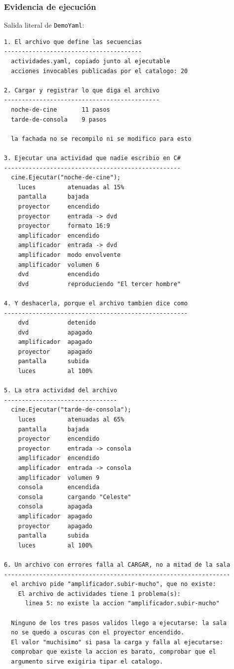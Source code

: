 \subsubsection*{Evidencia de ejecución}

Salida literal de \texttt{DemoYaml}:

{\footnotesize
\begin{verbatim}
1. El archivo que define las secuencias
---------------------------------------
  actividades.yaml, copiado junto al ejecutable
  acciones invocables publicadas por el catalogo: 20

2. Cargar y registrar lo que diga el archivo
--------------------------------------------
  noche-de-cine       11 pasos
  tarde-de-consola    9 pasos

  la fachada no se recompilo ni se modifico para esto

3. Ejecutar una actividad que nadie escribio en C#
--------------------------------------------------
  cine.Ejecutar("noche-de-cine");
    luces         atenuadas al 15%
    pantalla      bajada
    proyector     encendido
    proyector     entrada -> dvd
    proyector     formato 16:9
    amplificador  encendido
    amplificador  entrada -> dvd
    amplificador  modo envolvente
    amplificador  volumen 6
    dvd           encendido
    dvd           reproduciendo "El tercer hombre"

4. Y deshacerla, porque el archivo tambien dice como
----------------------------------------------------
    dvd           detenido
    dvd           apagado
    amplificador  apagado
    proyector     apagado
    pantalla      subida
    luces         al 100%

5. La otra actividad del archivo
--------------------------------
  cine.Ejecutar("tarde-de-consola");
    luces         atenuadas al 65%
    pantalla      bajada
    proyector     encendido
    proyector     entrada -> consola
    amplificador  encendido
    amplificador  entrada -> consola
    amplificador  volumen 9
    consola       encendida
    consola       cargando "Celeste"
    consola       apagada
    amplificador  apagado
    proyector     apagado
    pantalla      subida
    luces         al 100%

6. Un archivo con errores falla al CARGAR, no a mitad de la sala
----------------------------------------------------------------
  el archivo pide "amplificador.subir-mucho", que no existe:
    El archivo de actividades tiene 1 problema(s):
      linea 5: no existe la accion "amplificador.subir-mucho"

  Ninguno de los tres pasos validos llego a ejecutarse: la sala
  no se quedo a oscuras con el proyector encendido.
  El valor "muchisimo" si pasa la carga y falla al ejecutarse:
  comprobar que existe la accion es barato, comprobar que el
  argumento sirve exigiria tipar el catalogo.
\end{verbatim}
}

